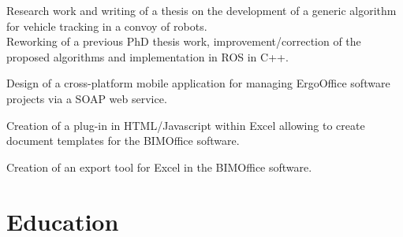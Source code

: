 \documentclass[letterpaper]{twentysecondcv - EN} %
\begin{document}
\begin{twenty}
	{
		Research work and writing of a thesis on the development of a generic algorithm for vehicle tracking in a convoy of robots. \\
		Reworking of a previous PhD thesis work, improvement/correction of the proposed algorithms and implementation in ROS in C++.
	}
	
	{
		Design of a cross-platform mobile application for managing ErgoOffice software projects via a SOAP web service.
	}
	
	{
		Creation of a plug-in in HTML/Javascript within Excel allowing to create document templates for the BIMOffice software.
	}

	
	{
		Creation of an export tool for Excel in the BIMOffice software.
	}

\end{twenty}



\section{Education}
\\
\begin{twenty} %
	
	\\
	
\end{twenty}

\end{document}
